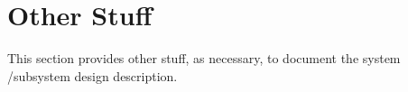 
\chapter{Other Stuff}
\label{loc:OtherStuff}


This section provides other stuff, as necessary, to document the system /subsystem design description.